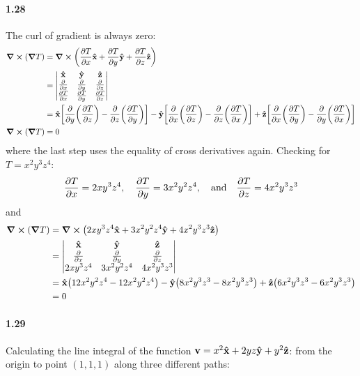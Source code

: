\documentclass[../main.tex]{subfiles}
\begin{document}
\paragraph{1.28}
The curl of gradient is always zero:
\begin{align*}
    \curl(\grad{T}) &= \curl \qt(\pdv{T}{x} \vu{x} + \pdv{T}{y} \vu{y} + \pdv{T}{z} \vu{z}) \\
    &= \begin{vmatrix}
        \vu{x} & \vu{y} & \vu{z} \\
        \pdv{x} & \pdv{y} & \pdv{z} \\
        \pdv{T}{x} & \pdv{T}{y} & \pdv{T}{z}
    \end{vmatrix} \\
    &= \vu{x} \qt[\pdv{y}(\pdv{T}{z}) - \pdv{z}(\pdv{T}{y})]
        - \vu{y} \qt[\pdv{x}(\pdv{T}{z}) - \pdv{z}(\pdv{T}{x})]
        + \vu{z} \qt[\pdv{x}(\pdv{T}{y}) - \pdv{y}(\pdv{T}{x})] \\
    \curl(\grad{T}) &= 0
\end{align*}
where the last step uses the equality of cross derivatives again. Checking for $T = x^2y^3z^4$:
\begin{align*}
    \pdv{T}{x} &= 2xy^3z^4 ,\quad \pdv{T}{y} = 3x^2y^2z^4 ,\qand \pdv{T}{z} = 4x^2y^3z^3 \\
\end{align*}
and
\begin{align*}
    \curl(\grad{T}) &= \curl \qt(2xy^3z^4 \vu{x} + 3x^2y^2z^4 \vu{y} + 4x^2y^3z^3 \vu{z}) \\
    &= \begin{vmatrix}
        \vu{x} & \vu{y} & \vu{z} \\
        \pdv{x} & \pdv{y} & \pdv{z} \\
        2xy^3z^4 & 3x^2y^2z^4 & 4x^2y^3z^3
    \end{vmatrix} \\
    &= \vu{x} \qt(12x^2y^2z^4 - 12x^2y^2z^4) - \vu{y} \qt(8x^2y^3z^3 - 8x^2y^3z^3)
        + \vu{z} \qt(6x^2y^3z^3 - 6x^2y^3z^3) \\
    &= 0
\end{align*}

\paragraph{1.29}
Calculating the line integral of the function $\vb{v} = x^2 \vu{x} + 2yz \vu{y} + y^2 \vu{z}$:
from the origin to point $(1,1,1)$ along three different paths:
\end{document}
